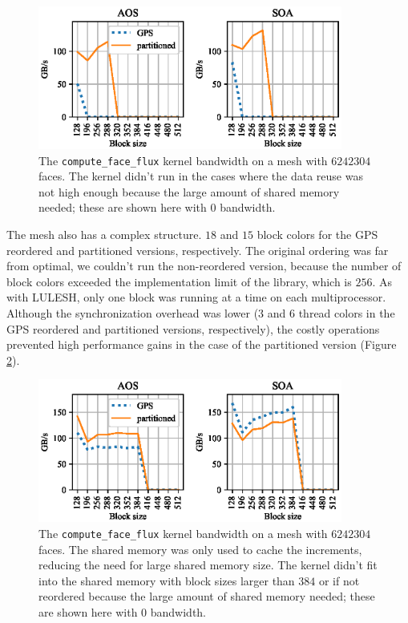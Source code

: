 \begin{figure}[Htbp]
  \centering
  \includegraphics[width=10cm]{fig/mini_aero_bw_crash.eps}
  \caption{The \texttt{compute\_face\_flux} kernel bandwidth on a mesh with
  $6242304$ faces. The kernel didn't run in the cases where the data reuse was
  not high enough because the large amount of shared memory needed; these are
  shown here with $0$ bandwidth.}
  \label{fig:mini_aero_bw_crash}
\end{figure}

The mesh also has a complex structure. $18$ and $15$ block colors for the GPS
reordered and partitioned versions, respectively. The original ordering was
far from optimal, we couldn't run the non-reordered version, because the 
number of block colors exceeded the implementation limit of the library, which 
is $256$. As with LULESH, only one block was running at a time on each 
multiprocessor. Although the synchronization overhead was lower ($3$ and $6$ 
thread colors in the GPS reordered and partitioned versions, respectively), the 
costly operations prevented high performance gains in the case of the 
partitioned version (Figure \ref{fig:mini_aero_bw_small-cache}).

\begin{figure}[Htbp]
  \centering
  \includegraphics[width=10cm]{fig/mini_aero_bw_small-cache.eps}
  \caption{The \texttt{compute\_face\_flux} kernel bandwidth on a mesh with
  $6242304$ faces. The shared memory was only used to cache the increments,
  reducing the need for large shared memory size. The kernel didn't fit into the
  shared memory with block sizes larger than $384$ or if not reordered because
  the large amount of shared memory needed; these are shown here with $0$
  bandwidth.}
  \label{fig:mini_aero_bw_small-cache}
\end{figure}

